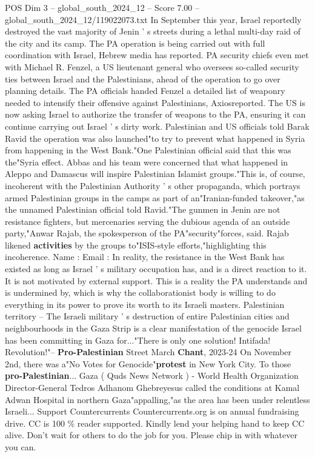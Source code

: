 \begin{textsample}{POS Dim 3 – global\_south\_2024\_12 – Score 7.00 – global\_south\_2024\_12/119022073.txt}
In September this year, Israel reportedly destroyed the vast majority of Jenin ' s streets during a lethal multi-day raid of the city and its camp.
The PA operation is being carried out with full coordination with Israel, Hebrew media has reported.
PA security chiefs even met with Michael R.
Fenzel, a US lieutenant general who oversees so-called security ties between Israel and the Palestinians, ahead of the operation to go over planning details.
The PA officials handed Fenzel a detailed list of weaponry needed to intensify their offensive against Palestinians, Axiosreported.
The US is now asking Israel to authorize the transfer of weapons to the PA, ensuring it can continue carrying out Israel ' s dirty work.
Palestinian and US officials told Barak Ravid the operation was also launched"to try to prevent what happened in Syria from happening in the West Bank."One Palestinian official said that this was the"Syria effect.
Abbas and his team were concerned that what happened in Aleppo and Damascus will inspire Palestinian Islamist groups."This is, of course, incoherent with the Palestinian Authority ' s other propaganda, which portrays armed Palestinian groups in the camps as part of an"Iranian-funded takeover,"as the unnamed Palestinian official told Ravid."The gunmen in Jenin are not resistance fighters, but mercenaries serving the dubious agenda of an outside party,"Anwar Rajab, the spokesperson of the PA"security"forces, said.
Rajab likened \textbf{activities} by the groups to"ISIS-style efforts,"highlighting this incoherence.
Name : Email : In reality, the resistance in the West Bank has existed as long as Israel ' s military occupation has, and is a direct reaction to it.
It is not motivated by external support.
This is a reality the PA understands and is undermined by, which is why the collaborationist body is willing to do everything in its power to prove its worth to its Israeli masters.
Palestinian territory -- The Israeli military ' s destruction of entire Palestinian cities and neighbourhoods in the Gaza Strip is a clear manifestation of the genocide Israel has been committing in Gaza for..."There is only one solution!
Intifada!
Revolution!"-- \textbf{Pro-Palestinian} Street March \textbf{Chant}, 2023-24 On November 2nd, there was a"No Votes for Genocide"\textbf{protest} in New York City.
To those \textbf{pro-Palestinian}...
Gaza ( Quds News Network ) - World Health Organization Director-General Tedros Adhanom Ghebreyesus called the conditions at Kamal Adwan Hospital in northern Gaza"appalling,"as the area has been under relentless Israeli...
Support Countercurrents Countercurrents.org is on annual fundraising drive.
CC is 100 \% reader supported.
Kindly lend your helping hand to keep CC alive.
Don't wait for others to do the job for you.
Please chip in with whatever you can.

\end{textsample}
